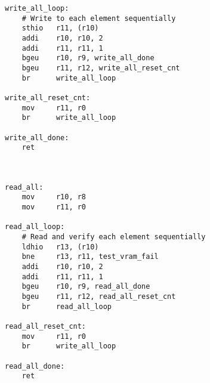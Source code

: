 \begin{lstlisting}
write_all_loop:
	# Write to each element sequentially
	sthio	r11, (r10)
	addi	r10, r10, 2
	addi	r11, r11, 1
	bgeu	r10, r9, write_all_done
	bgeu	r11, r12, write_all_reset_cnt
	br		write_all_loop

write_all_reset_cnt:
	mov		r11, r0
	br		write_all_loop

write_all_done:
	ret



read_all:
	mov		r10, r8
	mov		r11, r0

read_all_loop:
	# Read and verify each element sequentially
	ldhio	r13, (r10)
	bne		r13, r11, test_vram_fail
	addi	r10, r10, 2
	addi	r11, r11, 1
	bgeu	r10, r9, read_all_done
	bgeu	r11, r12, read_all_reset_cnt
	br		read_all_loop

read_all_reset_cnt:
	mov		r11, r0
	br		write_all_loop

read_all_done:
	ret
\end{lstlisting}
